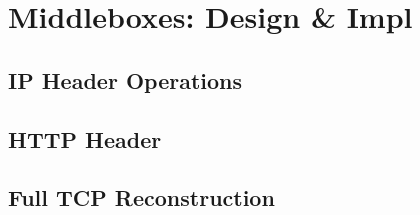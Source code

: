 
\section{Middleboxes: Design \& Impl}
\label{sec:mbs}

\subsection{IP Header Operations}

\subsection{HTTP Header}

\subsection{Full TCP Reconstruction}



